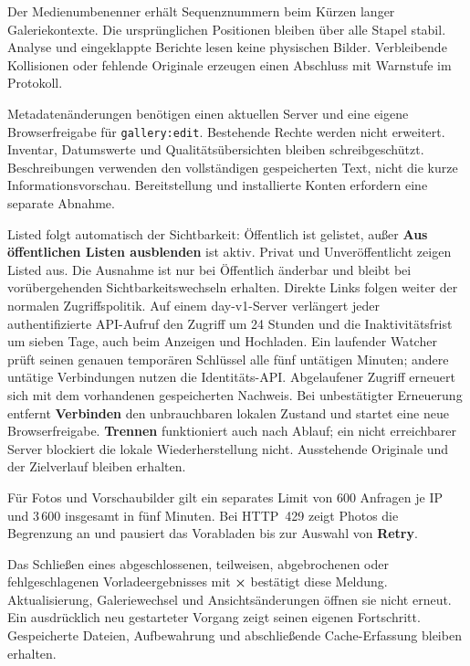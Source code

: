 \documentclass[11pt,a4paper]{article}
\newcommand{\ui}[1]{\textbf{#1}}
\begin{document}
Der Medienumbenenner erhält Sequenznummern beim Kürzen langer Galeriekontexte.
Die ursprünglichen Positionen bleiben über alle Stapel stabil. Analyse und
eingeklappte Berichte lesen keine physischen Bilder. Verbleibende Kollisionen
oder fehlende Originale erzeugen einen Abschluss mit Warnstufe im Protokoll.

Metadatenänderungen benötigen einen aktuellen Server und eine eigene
Browserfreigabe für \texttt{gallery:edit}. Bestehende Rechte werden nicht
erweitert. Inventar, Datumswerte und Qualitätsübersichten bleiben schreibgeschützt.
Beschreibungen verwenden den vollständigen gespeicherten Text, nicht die kurze
Informationsvorschau. Bereitstellung und installierte Konten erfordern eine
separate Abnahme.

Listed folgt automatisch der Sichtbarkeit: Öffentlich ist gelistet, außer
\ui{Aus öffentlichen Listen ausblenden} ist aktiv. Privat und Unveröffentlicht
zeigen Listed aus. Die Ausnahme ist nur bei Öffentlich änderbar und bleibt
bei vorübergehenden Sichtbarkeitswechseln erhalten. Direkte Links folgen
weiter der normalen Zugriffspolitik.
Auf einem day-v1-Server verlängert jeder authentifizierte API-Aufruf den Zugriff
um 24 Stunden und die Inaktivitätsfrist um sieben Tage, auch beim Anzeigen und
Hochladen. Ein laufender Watcher prüft seinen genauen temporären Schlüssel alle
fünf untätigen Minuten; andere untätige Verbindungen nutzen die Identitäts-API.
Abgelaufener Zugriff erneuert sich mit dem vorhandenen gespeicherten Nachweis.
Bei unbestätigter Erneuerung entfernt \ui{Verbinden} den unbrauchbaren lokalen
Zustand und startet eine neue Browserfreigabe. \ui{Trennen} funktioniert auch
nach Ablauf; ein nicht erreichbarer Server blockiert die lokale Wiederherstellung
nicht. Ausstehende Originale und der Zielverlauf bleiben erhalten.


Für Fotos und Vorschaubilder gilt ein
separates Limit von 600 Anfragen je IP und 3\,600 insgesamt in fünf Minuten.
Bei HTTP~429 zeigt Photos die Begrenzung an und pausiert das Vorabladen
bis zur Auswahl von \ui{Retry}.

Das Schließen eines abgeschlossenen, teilweisen, abgebrochenen oder
fehlgeschlagenen Vorladeergebnisses mit \ui{×} bestätigt diese Meldung. Aktualisierung,
Galeriewechsel und Ansichtsänderungen öffnen sie nicht erneut. Ein ausdrücklich
neu gestarteter Vorgang zeigt seinen eigenen Fortschritt. Gespeicherte Dateien,
Aufbewahrung und abschließende Cache-Erfassung bleiben erhalten.
\end{document}
